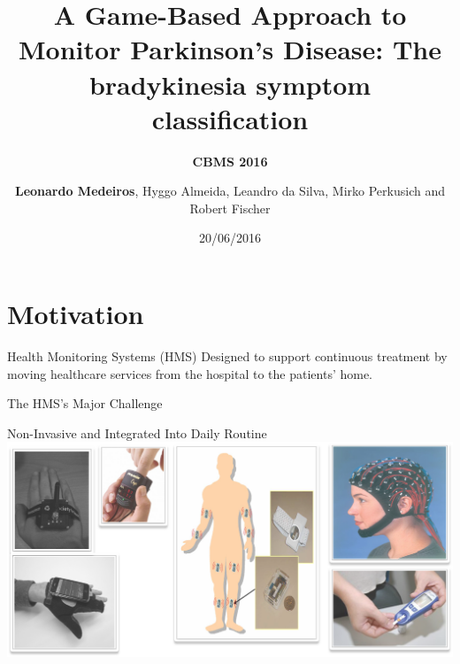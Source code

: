 \documentclass{beamer}
\author[]{\textbf{Leonardo Medeiros}, Hyggo Almeida, Leandro da Silva, Mirko Perkusich and Robert Fischer}
\date{20/06/2016}
\institute[]{Federal University Of Campina Grande - BRAZIL
}
\title{A Game-Based Approach to Monitor Parkinson's Disease: The bradykinesia symptom classification}
\subtitle{\textbf{CBMS 2016}}
\begin{document}
\begin{frame}
  \titlepage
\end{frame}

{
}






\section{Motivation}
\begin{frame}
  \begin{block}{Health Monitoring Systems (HMS)}
Designed to support continuous treatment by moving healthcare services from the hospital to the patients' home. 
  \end{block} 
\end{frame}

\begin{frame}{The HMS's Major Challenge}
  \begin{block}{Non-Invasive and Integrated Into Daily Routine}
  \center
      \includegraphics[height=1.8 in]{img/sismonsaude.png}
  \end{block}  
\end{frame}
\end{document}
